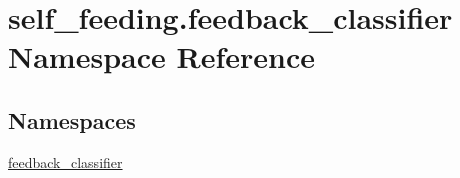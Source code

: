 \hypertarget{namespaceself__feeding_1_1feedback__classifier}{}\section{self\+\_\+feeding.\+feedback\+\_\+classifier Namespace Reference}
\label{namespaceself__feeding_1_1feedback__classifier}
\subsection*{Namespaces}
\begin{DoxyCompactItemize}
\item 
 \hyperlink{namespaceself__feeding_1_1feedback__classifier_1_1feedback__classifier}{feedback\+\_\+classifier}
\end{DoxyCompactItemize}
